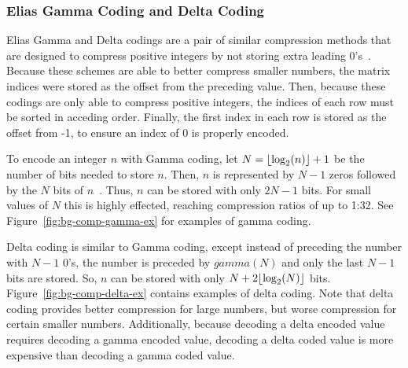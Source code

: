 \subsubsection{Elias Gamma Coding and Delta Coding}
Elias Gamma and Delta codings are a pair of similar compression methods that are designed to compress positive integers by not storing extra leading 0's~\cite{Elias:1975:codeword}.
Because these schemes are able to better compress smaller numbers, the matrix indices were stored as the offset from the preceding value.
Then, because these codings are only able to compress positive integers, the indices of each row must be sorted in acceding order.
Finally, the first index in each row is stored as the offset from -1, to ensure an index of 0 is properly encoded.

To encode an integer \(n\) with Gamma coding, let \(N = \lfloor\log_2(n)\rfloor+1\) be the number of bits needed to store \(n\).
Then, \(n\) is represented by \(N-1\) zeros followed by the \(N\) bits of \(n\)~\cite{Elias:1975:codeword}.
Thus, \(n\) can be stored with only \(2N-1\) bits.
For small values of \(N\) this is highly effected, reaching compression ratios of up to 1:32.
See Figure~\ref{fig:bg-comp-gamma-ex} for examples of gamma coding.



Delta coding is similar to Gamma coding, except instead of preceding the number with \(N-1\) 0's, the number is preceded by \(gamma(N)\) and only the last \(N-1\) bits are stored.
So, \(n\) can be stored with only \(N + 2\lfloor\log_2(N)\rfloor\) bits.
Figure~\ref{fig:bg-comp-delta-ex} contains examples of delta coding.
Note that delta coding provides better compression for large numbers, but worse compression for certain smaller numbers.
Additionally, because decoding a delta encoded value requires decoding a gamma encoded value, decoding a delta coded value is more expensive than decoding a gamma coded value.




